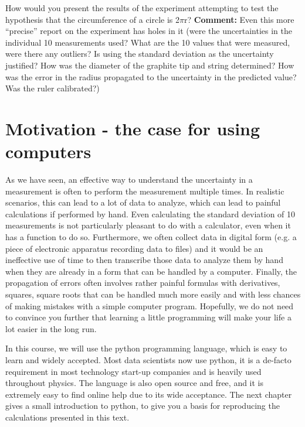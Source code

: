 \begin{example}{How would you present the results of the experiment attempting to test the hypothesis that the circumference of a circle is 2$\pi$r?}{}
\textbf{Comment:} Even this more ``precise'' report on the experiment has holes in it (were the uncertainties in the individual 10 measurements used? What are the 10 values that were measured, were there any outliers? Is using the standard deviation as the uncertainty justified? How was the diameter of the graphite tip and string determined? How was the error in the radius propagated to the uncertainty in the predicted value? Was the ruler calibrated?)
\end{example}


\section{Motivation - the case for using computers}
As we have seen, an effective way to understand the uncertainty in a measurement is often to perform the measurement multiple times. In realistic scenarios, this can lead to a lot of data to analyze, which can lead to painful calculations if performed by hand. Even calculating the standard deviation of 10 measurements is not particularly pleasant to do with a calculator, even when it has a function to do so. Furthermore, we often collect data in digital form (e.g. a piece of electronic apparatus recording data to files) and it would be an ineffective use of time to then transcribe those data to analyze them by hand when they are already in a form that can be handled by a computer. Finally, the propagation of errors often involves rather painful formulas with derivatives, squares, square roots that can be handled much more easily and with less chances of making mistakes with a simple computer program. Hopefully, we do not need to convince you further that learning a little programming will make your life a lot easier in the long run.

In this course, we will use the python programming language, which is easy to learn and widely accepted. Most data scientists now use python, it is a de-facto requirement in most technology start-up companies and is heavily used throughout physics. The language is also open source and free, and it is extremely easy to find online help due to its wide acceptance. The next chapter gives a small introduction to python, to give you a basis for reproducing the calculations presented in this text.


